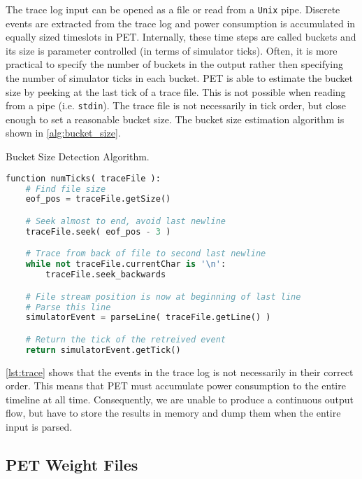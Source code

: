 The trace log input can be opened as a file or read from a \texttt{Unix} pipe.
Discrete events are extracted from the trace log and power consumption is
accumulated in equally sized timeslots in PET. Internally, these time steps are
called buckets and its size is parameter controlled (in terms of simulator
ticks). Often, it is more practical to specify the number of buckets in the
output rather then specifying the number of simulator ticks in each bucket. PET
is able to estimate the bucket size by peeking at the last tick of a trace file.
This is not possible when reading from a pipe (i.e. \texttt{stdin}). The trace
file is not necessarily in tick order, but close enough to set a reasonable
bucket size. The bucket size estimation algorithm is shown in
\autoref{alg:bucket_size}.

\begin{algorithm}[htb]
    \caption{Bucket Size Detection Algorithm.}
    \label{alg:bucket_size}
    \begin{lstlisting}[language=Python,style=algo]
function numTicks( traceFile ):
    # Find file size
    eof_pos = traceFile.getSize()

    # Seek almost to end, avoid last newline
    traceFile.seek( eof_pos - 3 )

    # Trace from back of file to second last newline
    while not traceFile.currentChar is '\n':
        traceFile.seek_backwards

    # File stream position is now at beginning of last line
    # Parse this line
    simulatorEvent = parseLine( traceFile.getLine() )

    # Return the tick of the retreived event
    return simulatorEvent.getTick()
    \end{lstlisting}
\end{algorithm}

\autoref{lst:trace} shows that the events in the trace log is not necessarily in
their correct order. This means that PET must accumulate power consumption to the
entire timeline at all time. Consequently, we are unable to produce a continuous
output flow, but have to store the results in memory and dump them when the
entire input is parsed. 

\subsection{PET Weight Files}

